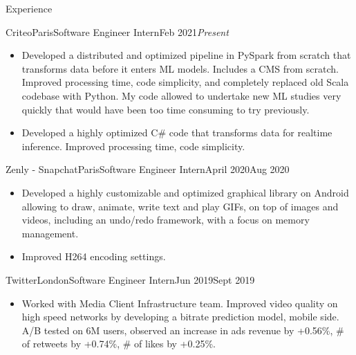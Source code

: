 \documentclass{resume}
\begin{document}
	\begin{rSection}{Experience}
        \begin{job}{Criteo}{Paris}{Software Engineer Intern}{Feb 2021}{\em{Present}}{
            \begin{itemize}
                \item Developed a distributed and optimized pipeline in PySpark from scratch that transforms data before it enters ML models. Includes a CMS from scratch. Improved processing time, code simplicity, and completely replaced old Scala codebase with Python. My code allowed to undertake new ML studies very quickly that would have been too time consuming to try previously.
                \item Developed a highly optimized C\# code that transforms data for realtime inference. Improved processing time, code simplicity.
            \end{itemize}
        }
        \end{job}

        \begin{job}{Zenly - Snapchat}{Paris}{Software Engineer Intern}{April 2020}{Aug 2020}{
            \begin{itemize}
                \item Developed a highly customizable and optimized graphical library on Android allowing to draw, animate, write text and play GIFs, on top of images and videos, including an undo/redo framework, with a focus on memory management.
                \item Improved H264 encoding settings.
            \end{itemize}
        }
        \end{job}

        \begin{job}{Twitter}{London}{Software Engineer Intern}{Jun 2019}{Sept 2019}{
            \begin{itemize}
                \item Worked with Media Client Infrastructure team. Improved video quality on high speed networks by developing a bitrate prediction model, mobile side. A/B tested on 6M users, observed an increase in ads revenue by +0.56\%, \# of retweets by +0.74\%, \# of likes by +0.25\%.
            \end{itemize}
        }
        \end{job}


\end{rSection}
\end{document}

